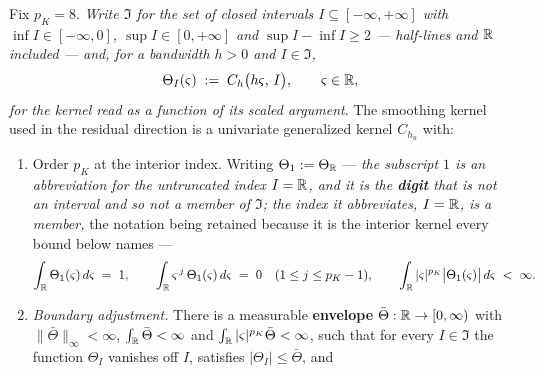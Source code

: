 \begin{assumption}\label{ass:app3}
Fix $p_K=8$. \emph{Write $\mathfrak I$ for the set of closed intervals $I\subseteq[-\infty,+\infty]$
with $\inf I\in[-\infty,0]$, $\sup I\in[0,+\infty]$ and $\sup I-\inf I\ge2$ --- half-lines and $\mathbb{R}$
included --- and, for a bandwidth $h>0$ and $I\in\mathfrak I$,}
\begin{equation}\label{eq:rescaled}
\Theta_I(\varsigma)\;:=\;C_{h}\big(h\varsigma,\,I\big),
\qquad\varsigma\in\mathbb{R},
\end{equation}
\emph{for the kernel read as a function of its scaled argument}. The smoothing kernel used in the residual
direction is a univariate generalized kernel $C_{h_u}$ with:
\begin{enumerate}
\item[(i)] Order $p_K$ at the interior index. Writing $\Theta_1:=\Theta_{\mathbb{R}}$ --- \emph{the subscript
$1$ is an abbreviation for the untruncated index $I=\mathbb{R}$, and it is the \textbf{digit} that is not an
interval and so not a member of $\mathfrak I$; the index it abbreviates, $I=\mathbb{R}$, is a member,} the
notation being retained because it is the interior kernel every bound below names ---
\[
\int_{\mathbb{R}}\Theta_1(\varsigma)\,d\varsigma\;=\;1,
\qquad
\int_{\mathbb{R}}\varsigma^{\,j}\,\Theta_1(\varsigma)\,d\varsigma\;=\;0
\quad (1\le j\le p_K-1),
\qquad
\int_{\mathbb{R}}|\varsigma|^{p_K}\big|\Theta_1(\varsigma)\big|\,d\varsigma\;<\;\infty .
\]
\item[(ii)] \emph{Boundary adjustment.} There is a measurable \textbf{envelope}
$\bar\Theta:\mathbb{R}\to[0,\infty)$ with $\|\bar\Theta\|_\infty<\infty$, $\int_{\mathbb{R}}\bar\Theta<\infty$ and
$\int_{\mathbb{R}}|\varsigma|^{p_K}\bar\Theta<\infty$, such that for every $I\in\mathfrak I$ the function
$\Theta_{I}$ vanishes off $I$, satisfies $|\Theta_I|\le\bar\Theta$, and
\begin{equation}\label{eq:truncmom}

\end{equation}
\end{enumerate}
\end{assumption}
